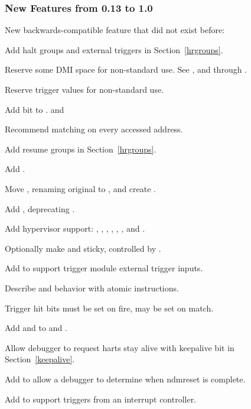 \subsubsection{New Features from 0.13 to 1.0}

\begin{steps}{New backwards-compatible feature that did not exist before:}
    \item Add halt groups and external triggers in Section~\ref{hrgroups}. 
    \item Reserve some DMI space for non-standard use. See \RdmCustom, and
        \RdmCustomZero through \RdmCustomFifteen. 
    \item Reserve trigger \FcsrTdataOneType values for non-standard use. 
    \item Add \FcsrItriggerNmi bit to \RcsrItrigger.  and 
    \item Recommend matching on every accessed address. 
    \item Add resume groups in Section~\ref{hrgroups}. 
    \item Add \FdmAbstractcsRelaxedpriv. 
    \item Move \RcsrScontext, renaming original to \RcsrMscontext, and create
        \RcsrHcontext. 
    \item Add \RcsrMcontrolSix, deprecating \RcsrMcontrol. 
    \item Add hypervisor support: \FcsrDcsrEbreakvs, \FcsrDcsrEbreakvu,
        \FcsrDcsrV, \RcsrHcontext, \RcsrMcontrol, \RcsrMcontrolSix, and
        \RvirtPriv. 
    \item Optionally make \FdmDmstatusAnyunavail and \FdmDmstatusAllunavail
    sticky, controlled by \FdmDmstatusStickyunavail. 
    \item Add \RcsrTmexttrigger to support trigger module external trigger
        inputs. 
    \item Describe \RcsrMcontrol and \RcsrMcontrolSix behavior with atomic instructions. 
    \item Trigger hit bits must be set on fire, may be set on match. 
    \item Add \FcsrTextraThirtytwoSbytemask and \FcsrTextraSixtyfourSbytemask
        to \RcsrTextraThirtytwo and \RcsrTextraSixtyfour. 
    \item Allow debugger to request harts stay alive with keepalive bit in
        Section~\ref{keepalive}. 
    \item Add \FdmDmstatusNdmresetpending to allow a debugger to determine
        when ndmreset is complete. 
    \item Add \FcsrTmexttriggerIntctl to support triggers from an interrupt controller. 
\end{steps}

